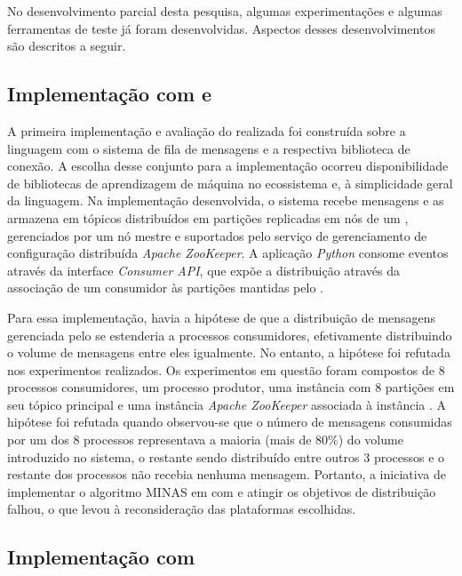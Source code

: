 No desenvolvimento parcial desta pesquisa, algumas experimentações e algumas
ferramentas de teste já foram desenvolvidas.
Aspectos desses desenvolvimentos são descritos a seguir.

\subsection{Implementação com \python e \kafka}

A primeira implementação e avaliação do \mfog realizada foi construída sobre a
linguagem \python com o sistema de fila de mensagens \kafka e a respectiva
biblioteca de conexão.
A escolha desse conjunto para a implementação ocorreu 
disponibilidade de bibliotecas de aprendizagem de máquina no ecossistema
\python e, à simplicidade geral da linguagem.
Na implementação desenvolvida, o sistema \kafka recebe mensagens e as armazena
em tópicos distribuídos em partições replicadas em nós de um \cluster,
gerenciados por um nó mestre e suportados pelo serviço de gerenciamento de
configuração distribuída \emph{Apache ZooKeeper}.
A aplicação \emph{Python} consome eventos através da interface \emph{Consumer API},
que expõe a distribuição através da associação de um consumidor às partições
mantidas pelo \kafka.

Para essa implementação, havia a hipótese de que a distribuição de
mensagens gerenciada pelo \kafka
se estenderia a processos consumidores, efetivamente distribuindo o volume de
mensagens entre eles igualmente.
No entanto, a hipótese foi refutada nos experimentos realizados.
Os experimentos em questão foram compostos de 8 processos consumidores, um
processo produtor, uma instância \kafka com 8 partições em seu tópico principal
e uma instância \emph{Apache ZooKeeper} associada à instância \kafka.
A hipótese foi refutada quando observou-se que o número de
mensagens consumidas por um dos 8 processos representava a maioria (mais de
80\%) do volume introduzido no sistema, o restante sendo distribuído entre
outros 3 processos e o restante dos processos não recebia nenhuma mensagem.
Portanto, a iniciativa de implementar o algoritmo MINAS em \python com \kafka e
atingir os objetivos de distribuição falhou, o que levou à reconsideração das
plataformas escolhidas.

\subsection{Implementação com \flink}

